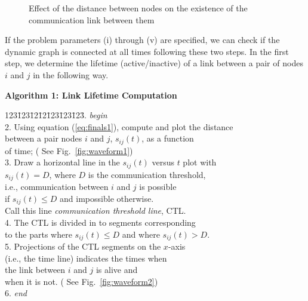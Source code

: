 \documentclass[10pt]{IEEEtran}
\begin{document}
\begin{figure*}[htb]
\centering
{}
\hfill
{}
\caption{Effect of the distance between nodes on the existence of the communication link between them}
\label{fig:waveform}
\end{figure*}

If the problem parameters (i) through (v) are specified, we can check if the dynamic graph is connected at all times following these two steps. In the first step, we determine the lifetime (active/inactive) of a link between a pair of nodes $i$ and $j$ in the following way.

\vspace{0.1 in}
\noindent
{\bf Algorithm 1:  Link Lifetime Computation }

\vspace{0.05 in}
\begin{tabbing}
123\=123\=12\=12\=123\=123\=123\= . {\em begin}\\
2. \> Using equation (\ref{eq:finals1}), compute and plot the distance\\
\> \> between a pair nodes $i$ and $j$, $s_{ij}(t)$, as a function\\
\> \> of time; (\* See Fig.~\ref{fig:waveform1})\\
3. \> Draw a horizontal line in the $s_{ij}(t)$ versus $t$ plot with\\
 \> \> $s_{ij}(t) = D$, where $D$ is the communication threshold,\\
 \> \> i.e., communication between $i$ and $j$ is possible\\
 \> \>  if $s_{ij}(t) \leq  D$ and impossible otherwise.\\
 \> \> Call this line {\em communication threshold line}, CTL.\\
4. \> The CTL is divided in to segments corresponding\\
\> \>  to the parts where $s_{ij}(t) \leq  D$ and where $s_{ij}(t) >  D$.\\
5. \> Projections of the CTL segments on the $x$-axis \\
\> \> (i.e., the time line) indicates the times when\\
\> \> the link between $i$ and $j$ is alive and \\
\> \>  when it is not. (\* See Fig.~\ref{fig:waveform2})\\
6. {\em end}
\end{tabbing}
\end{document}

